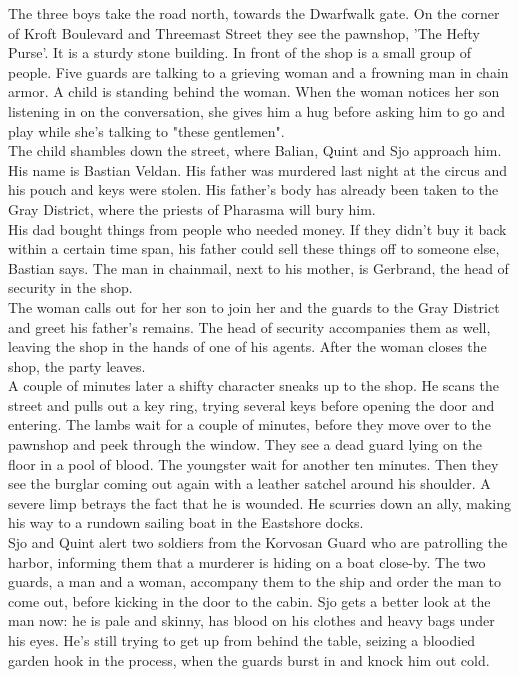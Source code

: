 The three boys take the road north, towards the Dwarfwalk gate. On the corner of Kroft Boulevard and Threemast Street they see the pawnshop, 'The Hefty Purse'. It is a sturdy stone building. In front of the shop is a small group of people. Five guards are talking to a grieving woman and a frowning man in chain armor. A child is standing behind the woman. When the woman notices her son listening in on the conversation, she gives him a hug before asking him to go and play while she's talking to "these gentlemen".\\

The child shambles down the street, where Balian, Quint and Sjo approach him. His name is Bastian Veldan. His father was murdered last night at the circus and his pouch and keys were stolen. His father's body has already been taken to the Gray District, where the priests of Pharasma will bury him.\\

His dad bought things from people who needed money. If they didn't buy it back within a certain time span, his father could sell these things off to someone else, Bastian says. The man in chainmail, next to his mother, is Gerbrand, the head of security in the shop.\\

The woman calls out for her son to join her and the guards to the Gray District and greet his father's remains. The head of security accompanies them as well, leaving the shop in the hands of one of his agents. After the woman closes the shop, the party leaves.\\

A couple of minutes later a shifty character sneaks up to the shop. He scans the street and pulls out a key ring, trying several keys before opening the door and entering. The lambs wait for a couple of minutes, before they move over to the pawnshop and peek through the window. They see a dead guard lying on the floor in a pool of blood. The youngster wait for another ten minutes. Then they see the burglar coming out again with a leather satchel around his shoulder. A severe limp betrays the fact that he is wounded. He scurries down an ally, making his way to a rundown sailing boat in the Eastshore docks.\\

Sjo and Quint alert two soldiers from the Korvosan Guard who are patrolling the harbor, informing them that a murderer is hiding on a boat close-by. The two guards, a man and a woman, accompany them to the ship and order the man to come out, before kicking in the door to the cabin. Sjo gets a better look at the man now: he is pale and skinny, has blood on his clothes and heavy bags under his eyes. He's still trying to get up from behind the table, seizing a bloodied garden hook in the process, when the guards burst in and knock him out cold.\\

